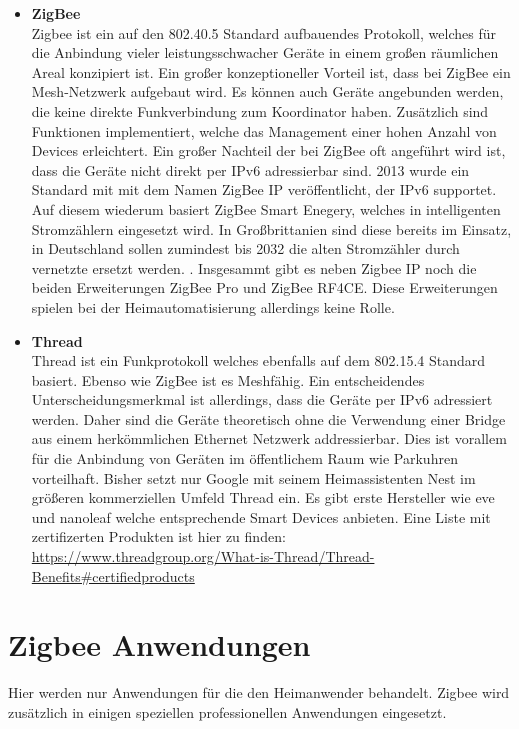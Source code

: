 \begin{itemize}
    \item \textbf{ZigBee}\\
    Zigbee \cite{zigbee} ist ein auf den 802.40.5 Standard aufbauendes Protokoll, welches für die Anbindung vieler leistungsschwacher
    Geräte in einem großen räumlichen Areal konzipiert ist. Ein großer konzeptioneller Vorteil ist, dass bei 
    ZigBee ein Mesh-Netzwerk aufgebaut wird. Es können auch Geräte angebunden werden, die keine direkte Funkverbindung
    zum Koordinator haben. Zusätzlich sind Funktionen implementiert, welche das Management einer hohen Anzahl von Devices
    erleichtert. Ein großer Nachteil der bei ZigBee oft angeführt wird ist, dass die Geräte nicht direkt per IPv6 adressierbar sind. 2013 wurde 
    ein Standard mit mit dem Namen \grqq ZigBee IP\grqq{} veröffentlicht, der IPv6 supportet. Auf diesem wiederum basiert ZigBee Smart Enegery, welches in 
    intelligenten Stromzählern eingesetzt wird. In Großbrittanien sind diese bereits im Einsatz\cite{se}, in Deutschland sollen zumindest bis 2032 die alten Stromzähler 
    durch vernetzte ersetzt werden. \cite{bmwk}. Insgesammt gibt es neben Zigbee IP noch die beiden Erweiterungen ZigBee Pro und ZigBee RF4CE. Diese Erweiterungen spielen
    bei der Heimautomatisierung allerdings keine Rolle.
    
    \item \textbf{Thread}\\
    Thread \cite{thread} ist ein Funkprotokoll welches ebenfalls auf dem 802.15.4 Standard basiert. Ebenso wie ZigBee ist es Meshfähig. Ein
    entscheidendes Unterscheidungsmerkmal ist allerdings, dass die Geräte per IPv6 adressiert werden. Daher sind die Geräte
    theoretisch ohne die Verwendung einer Bridge aus einem herkömmlichen Ethernet Netzwerk addressierbar. Dies ist vorallem für die Anbindung 
    von Geräten im öffentlichem Raum wie Parkuhren vorteilhaft. Bisher setzt nur Google mit seinem Heimassistenten Nest im größeren kommerziellen
    Umfeld Thread ein. Es gibt erste Hersteller wie eve und nanoleaf welche entsprechende Smart Devices anbieten. Eine Liste mit zertifizerten Produkten ist 
    hier zu finden: \url{https://www.threadgroup.org/What-is-Thread/Thread-Benefits#certifiedproducts}
\end{itemize}

\section{Zigbee Anwendungen}

Hier werden nur Anwendungen für die den Heimanwender behandelt. Zigbee wird zusätzlich in einigen speziellen professionellen Anwendungen eingesetzt.

